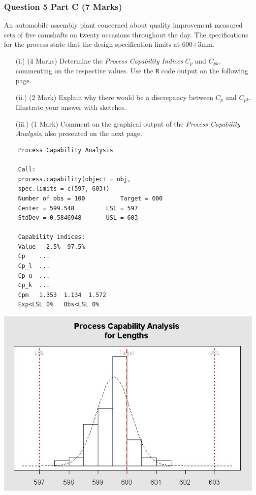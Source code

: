 \documentclass[a4paper,12pt]{article}
\begin{document}
\subsubsection*{Question 5 Part C (7 Marks)}
An automobile assembly plant concerned about quality improvement measured sets of five camshafts on twenty occasions throughout the day. The specifications for the process state that the design specification limits at 600$\pm$3mm.


\begin{itemize}
	\item[(i.)] (4 Marks) Determine the \emph{Process Capability Indices} $C_p$ and $C_{pk}$, commenting on the respective values. Use the \texttt{R} code output on the following page.
	\item[(ii.)] (2 Mark)  Explain why there would be a discrepancy between $C_p$ and $C_{pk}$. Illustrate your answer with sketches.
	\item[(iii.)] (1 Mark) Comment on the graphical output of the \emph{Process Capability Analysis}, also presented on the next page.
\end{itemize}



\newpage
\begin{framed}
	\begin{verbatim}
	Process Capability Analysis
	
	Call:
	process.capability(object = obj,  
	spec.limits = c(597, 603))
	Number of obs = 100          Target = 600
	Center = 599.548         LSL = 597
	StdDev = 0.5846948       USL = 603
	
	Capability indices:
	Value   2.5%  97.5%
	Cp    ...
	Cp_l  ...
	Cp_u  ...
	Cp_k  ...
	Cpm   1.353  1.134  1.572
	Exp<LSL 0%   Obs<LSL 0%
	\end{verbatim}
\end{framed}



\begin{center}
	\includegraphics[scale=0.55]{image/ExamQ4hist}
\end{center}
\newpage
%
%
%
\end{document}
